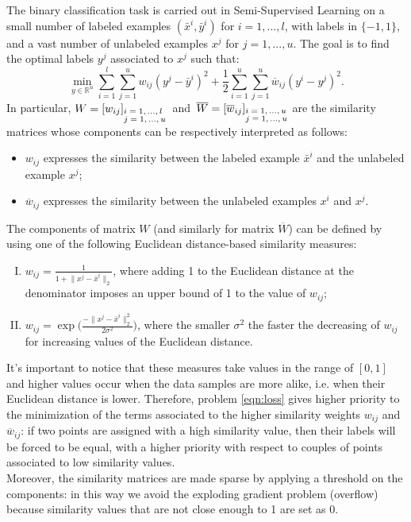 \documentclass[10pt,twocolumn,letterpaper]{article}
\begin{document}
The binary classification task is carried out in Semi-Supervised Learning on a small number of labeled examples $(\bar{x}^{i}, \bar{y}^{i})$ for $i=1,...,l$, with labels in $\{-1,1\}$, and a vast number of unlabeled examples $x^{j}$ for $j=1,...,u$. The goal is to find the optimal labels $y^{j}$ associated to $x^{j}$ such that:
\begin{equation}\label{eqn:loss}
	\min_{y\in \mathbb{R}^{u}} \sum_{i=1}^{l} \sum_{j=1}^{u} w_{ij}(y^{j}-\bar{y}^{i})^{2} + \frac{1}{2}\sum_{i=1}^{u}\sum_{j=1}^{u} \overline{w}_{ij}(y^{i}-y^{j})^{2}.
\end{equation} 
In particular, \mbox{$W=[w_{ij}]_{\begin{subarray}{l}\text{$i=1,...,l$}\\ \text{$j=1,...,u$}\end{subarray}}$ and $\overline{W}=[\overline{w}_{ij}]_{\begin{subarray}{l}\text{$i=1,...,u$}\\ \text{$j=1,...,u$}\end{subarray}}$} are the similarity matrices whose components can be respectively interpreted as follows:
\begin{itemize}
	\item $w_{ij}$ expresses the similarity between the labeled example $\bar{x}^{i}$ and the unlabeled example $x^{j}$;
	\item $\overline{w}_{ij}$ expresses the similarity between the unlabeled examples $x^{i}$ and $x^{j}$.
\end{itemize}
The components of matrix $W$ (and similarly for matrix $\overline{W}$) can be defined by using one of the following Euclidean distance-based similarity measures:
\begin{enumerate}[(I)]
	\item $\displaystyle w_{ij} = \frac{1}{1+\lVert x^{j} - \bar{x}^{i} \rVert_{2}}$, where adding 1 to the Euclidean distance at the denominator imposes an upper bound of 1 to the value of $w_{ij}$;
	\item $\displaystyle w_{ij} = \exp\bigg(\frac{-\lVert x^{j} - \bar{x}^{i} \rVert_{2}^{2}}{2\sigma^{2}}\bigg)$, where the smaller $\sigma^2$ the faster the decreasing of $w_{ij}$ for increasing values of the Euclidean distance.
\end{enumerate}
It's important to notice that these measures take values in the range of $[0,1]$ and higher values occur when the data samples are more alike, i.e. when their Euclidean distance is lower. Therefore, problem \eqref{eqn:loss} gives higher priority to the minimization of the terms associated to the higher similarity weights $w_{ij}$ and $\overline{w}_{ij}$: if two points are assigned with a high similarity value, then their labels will be forced to be equal, with a higher priority with respect to couples of points associated to low similarity values.\\
Moreover, the similarity matrices are made sparse by applying a threshold on the components: in this way we avoid the exploding gradient problem (overflow) because similarity values that are not close enough to 1 are set as 0.\\
\end{document}
